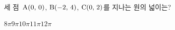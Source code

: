 세 점~$\mathrm{A}(0,\mkern3mu 0)$, $\mathrm{B}(-2,\mkern3mu 4)$, $\mathrm{C}(0,\mkern3mu 2)$를 지나는 원의 넓이는?
\begin{choices32}{$8\pi$}{$9\pi$}{$10\pi$}{$11\pi$}{$12\pi$}\end{choices32}
